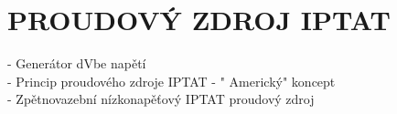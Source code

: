 \section{PROUDOVÝ ZDROJ IPTAT}
- Generátor dVbe napětí\\
- Princip proudového zdroje IPTAT - " Americký" koncept\\
- Zpětnovazební nízkonapěťový IPTAT proudový zdroj\\


